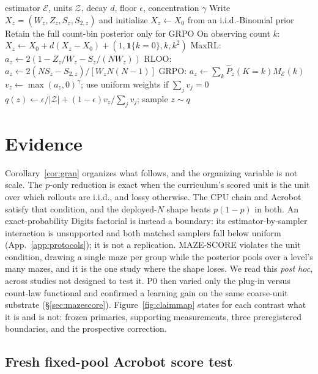 \begin{algorithm}[t]
\caption{Count-law curriculum step (fixed group size $N$)}
\label{alg:countlaw}
\begin{algorithmic}[1]
\REQUIRE estimator $\mathcal E$, units $\mathcal Z$, decay $d$, floor $\epsilon$, concentration $\gamma$
\STATE Write $X_z=(W_z,Z_z,S_z,S_{2,z})$ and initialize $X_z\leftarrow X_0$ from an i.i.d.-Binomial prior
\STATE Retain the full count-bin posterior only for GRPO
\STATE On observing count $k$: $X_z\leftarrow X_0+d(X_z-X_0)+(1,\mathbf1\{k=0\},k,k^2)$
\STATE MaxRL: $a_z\leftarrow2(1-Z_z/W_z-S_z/(NW_z))$
\STATE RLOO: $a_z\leftarrow2(NS_z-S_{2,z})/[W_zN(N-1)]$
\STATE GRPO: $a_z\leftarrow\sum_k\widehat P_z(K=k)M_{\mathcal E}(k)$
\STATE $v_z\leftarrow\max(a_z,0)^\gamma$; use uniform weights if $\sum_jv_j=0$
\STATE $q(z)\leftarrow\epsilon/|\mathcal Z|+(1-\epsilon)v_z/\sum_jv_j$; sample $z\sim q$
\end{algorithmic}
\end{algorithm}

\section{Evidence}
\label{sec:evidence}

Corollary~\ref{cor:gran} organizes what follows, and the organizing variable
is not scale. The $p$-only reduction is exact when the curriculum's scored unit
is the unit over which rollouts are i.i.d., and lossy otherwise. The CPU chain
and Acrobot satisfy that condition, and the deployed-$N$ shape beats $p(1-p)$
in both. An exact-probability Digits factorial is instead a boundary: its
estimator-by-sampler interaction is unsupported and both matched samplers fall
below uniform (App.~\ref{app:protocols}); it is not a replication. MAZE-SCORE
violates the unit condition, drawing a single maze per group
while the posterior pools over a level's many mazes, and it is the one study
where the shape loses. We read this \emph{post hoc}, across studies not
designed to test it. P0 then varied only the plug-in versus count-law
functional and confirmed a learning gain on the same coarse-unit substrate
(\S\ref{sec:mazescore}). Figure~\ref{fig:claimmap} states for each contrast
what it is and is not: frozen primaries, supporting measurements, three
preregistered boundaries, and the prospective correction.



\subsection{Fresh fixed-pool Acrobot score test}
\label{sec:acrobot}

